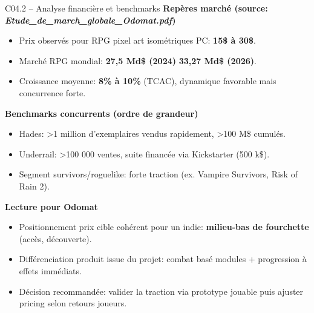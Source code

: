 \documentclass[aspectratio=169]{beamer}
\begin{document}
\begin{frame}{C04.2 -- Analyse financi\`ere et benchmarks}
\textbf{Rep\`eres march\'e (source: \textit{Etude\_de\_march\_globale\_Odomat.pdf})}
\begin{itemize}
    \item Prix observ\'es pour RPG pixel art isom\'etriques PC: \textbf{15\$ \`a 30\$}.
    \item March\'e RPG mondial: \textbf{27,5 Md\$ (2024)} \textrightarrow{} \textbf{33,27 Md\$ (2026)}.
    \item Croissance moyenne: \textbf{8\% \`a 10\%} (TCAC), dynamique favorable mais concurrence forte.
\end{itemize}

\textbf{Benchmarks concurrents (ordre de grandeur)}
\begin{itemize}
    \item Hades: >1 million d'exemplaires vendus rapidement, >100 M\$ cumul\'es.
    \item Underrail: >100 000 ventes, suite financ\'ee via Kickstarter (500 k\$).
    \item Segment survivors/roguelike: forte traction (ex. Vampire Survivors, Risk of Rain 2).
\end{itemize}

\textbf{Lecture pour Odomat}
\begin{itemize}
    \item Positionnement prix cible coh\'erent pour un indie: \textbf{milieu-bas de fourchette} (acc\`es, d\'ecouverte).
    \item Diff\'erenciation produit issue du projet: combat bas\'e modules + progression \`a effets imm\'ediats.
    \item D\'ecision recommand\'ee: valider la traction via prototype jouable puis ajuster pricing selon retours joueurs.
\end{itemize}
\end{frame}
\end{document}
